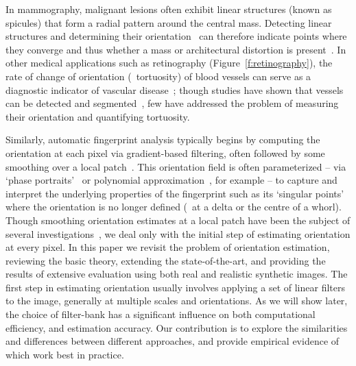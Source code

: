 \documentclass[10pt,twocolumn,letterpaper]{article}
\newcommand{\fref}[1]{Figure~\ref{#1}}
\newcommand{\comment}[1]{}
\begin{document}
In mammography, malignant lesions often exhibit linear structures (known as spicules) that form a radial pattern around the central mass. Detecting linear structures and determining their orientation~\cite{Zwiggelaar_etal_MIA99,Zwiggelaar_etal_TMI04} can therefore indicate points where they converge and thus whether a mass or architectural distortion is present~\cite{Karssemeijer_teBrake_TMI96,Rangayyan_Ayres_MBEC06}. In other medical applications such as retinography (\fref{f:retinography}), the rate of change of orientation (\ie~tortuosity) of blood vessels can serve as a diagnostic indicator of vascular disease~\cite{Hart_etal_IJMI99}; though studies have shown that vessels can be detected and segmented~\cite{Staal_etal_TMI04,Ricci_Perfetti_TMI07,Dabbah_etal_MICCAI10}, few have addressed the problem of measuring their orientation and quantifying tortuosity.

\comment{Dabbah et al is nerve fibre detection, not vessel}
Similarly, automatic fingerprint analysis typically begins by computing the orientation at each pixel via gradient-based filtering, often followed by some smoothing over a local patch~\cite{Bazen_Gerez_TPAMI02,Mei_etal_IVC09}. This orientation field is often parameterized -- via `phase portraits'~\cite{Li_etal_PR06} or polynomial approximation~\cite{Gu_etal_PR04}, for example -- to capture and interpret the underlying properties of the fingerprint such as its `singular points' where the orientation is no longer defined (\eg~at a delta or the centre of a whorl). Though smoothing orientation estimates at a local patch have been the subject of several investigations~\cite{Kass_Witkin_CVGIP87,Rao_Jain_TPAMI92,Perona_TIP98}, we deal only with the initial step of estimating orientation at every pixel.
In this paper we revisit the problem of orientation estimation, reviewing the basic theory, extending the state-of-the-art, and providing the results of extensive evaluation using both real and realistic synthetic images. The first step in estimating orientation usually involves applying a set of linear filters to the image, generally at multiple scales and orientations. As we will show later, the choice of filter-bank has a significant influence on both computational efficiency, and estimation accuracy. Our contribution is to explore the similarities and differences between different approaches, and provide empirical evidence of which work best in practice.
\end{document}
